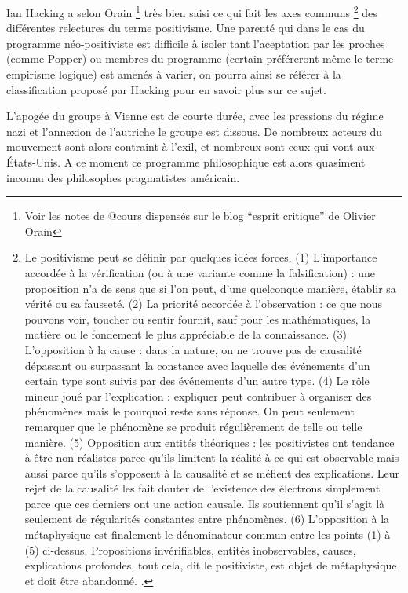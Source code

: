 Ian Hacking \autocite{Hacking1983} a selon Orain \footnote{Voir les notes de \href{http://www.esprit-critique.net/article-12642840.html}{@cours} dispensés sur le blog \enquote{esprit critique} de Olivier Orain} très bien saisi ce qui fait les axes communs \footnote{Le positivisme peut se définir par quelques idées forces. (1) L’importance accordée à la vérification (ou à une variante comme la falsification) : une proposition n’a de sens que si l’on peut, d’une quelconque manière, établir sa vérité ou sa fausseté. (2) La priorité accordée à l’observation : ce que nous pouvons voir, toucher ou sentir fournit, sauf pour les mathématiques, la matière ou le fondement le plus appréciable de la connaissance. (3) L’opposition à la cause : dans la nature, on ne trouve pas de causalité dépassant ou surpassant la constance avec laquelle des événements d’un certain type sont suivis par des événements d’un autre type. (4) Le rôle mineur joué par l’explication : expliquer peut contribuer à organiser des phénomènes mais le pourquoi reste sans réponse. On peut seulement remarquer que le phénomène se produit régulièrement de telle ou telle manière. (5) Opposition aux entités théoriques : les positivistes ont tendance à être non réalistes parce qu’ils limitent la réalité à ce qui est observable mais aussi parce qu’ils s’opposent à la causalité et se méfient des explications. Leur rejet de la causalité les fait douter de l’existence des électrons simplement parce que ces derniers ont une action causale. Ils soutiennent qu’il s’agit là seulement de régularités constantes entre phénomènes. (6) L’opposition à la métaphysique est finalement le dénominateur commun entre les points (1) à (5) ci-dessus. Propositions invérifiables, entités inobservables, causes, explications profondes, tout cela, dit le positiviste, est objet de métaphysique et doit être abandonné. \autocite[82]{Hacking1983}.} des différentes relectures du terme positivisme. Une parenté qui dans le cas du programme néo-positiviste est difficile à isoler tant l'aceptation par les proches (comme Popper) ou membres du programme (certain préféreront même le terme empirisme logique) est amenés à varier, on pourra ainsi se référer à la classification proposé par Hacking pour en savoir plus sur ce sujet. \autocite[81-86]{Hacking1983}

L'apogée du groupe à Vienne est de courte durée, avec les pressions du régime nazi et l'annexion de l'autriche le groupe est dissous. De nombreux acteurs du mouvement sont alors contraint à l'exil, et nombreux sont ceux qui vont aux États-Unis. A ce moment ce programme philosophique est alors quasiment inconnu des philosophes pragmatistes américain. 

